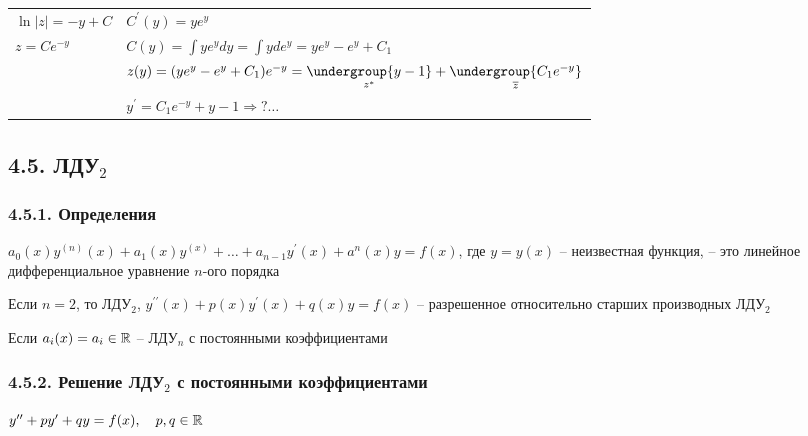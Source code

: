 \documentclass[12pt]{article}
\begin{document}
\begin{enumerate}[label*=\arabic** ]
\begin{tabular}{p{5cm}p{10cm}}
            $\ln|z| = -y + C$     & $C^\prime (y) = ye^{y}$                                                                                                   \\

            $z = Ce^{-y}$         & $C(y) = \int y e^y dy = \int y de^y = ye^y - e^y + C_1$                                                                   \\

            & $z(y) = (ye^y - e^y + C_1)e^{-y} = \underset{z^*}{\undergroup{y - 1}} + \underset{\overline{z}}{\undergroup{C_1 e^{-y}}}$ \\

            & $y^\prime = C_1 e^{-y} + y - 1 \Longrightarrow ? \dots $

        \end{tabular}

    \end{enumerate}


    \subsection{4.5. ЛДУ$_2$}

    \hypertarget{lineardifferentialequationhigherdegree}{}

    \subsubsection{4.5.1. Определения}

    \Def $a_0(x) y^{(n)}(x) + a_1(x)y^{(x)} + \dots + a_{n - 1}y^\prime(x) + a^n(x)y = f(x)$, где $y = y(x)$ -- неизвестная функция, -- это линейное дифференциальное уравнение $n$-ого порядка

    \Notas Если $n = 2$, то ЛДУ$_2$, $y^{\prime\prime}(x) + p(x)y^\prime(x) + q(x)y = f(x)$ -- разрешенное относительно старших производных ЛДУ$_2$

    \Notas Если $a_i(x) = a_i \in \mathbb{R}$ -- ЛДУ$_n$ с постоянными коэффициентами

    \hypertarget{lineardifferentialequationseconddegreewithconstants}{}

    \subsubsection{4.5.2. Решение ЛДУ$_2$ с постоянными коэффициентами}

    $y^{\prime\prime} + p y^\prime + q y = f(x), \quad p, q \in \mathbb{R}$
\end{document}
